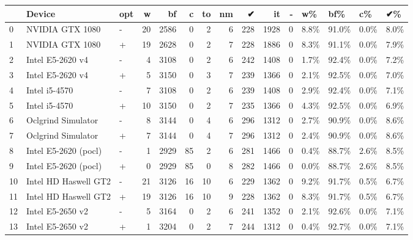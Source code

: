 \begin{tabular}{lllrrrrrrrrllll}
\toprule
{} &                Device & opt &   w &    bf &   c &  to &  nm &    ✔ &    it &  - &    w\% &    bf\% &    c\% &    ✔\% \\
\midrule
0  &       NVIDIA GTX 1080 &   - &  20 &  2586 &   0 &   2 &   6 &  228 &  1928 &  0 &  8.8\% &  91.0\% &  0.0\% &  8.0\% \\
1  &       NVIDIA GTX 1080 &   + &  19 &  2628 &   0 &   2 &   7 &  228 &  1886 &  0 &  8.3\% &  91.1\% &  0.0\% &  7.9\% \\
2  &      Intel E5-2620 v4 &   - &   4 &  3108 &   0 &   2 &   6 &  242 &  1408 &  0 &  1.7\% &  92.4\% &  0.0\% &  7.2\% \\
3  &      Intel E5-2620 v4 &   + &   5 &  3150 &   0 &   3 &   7 &  239 &  1366 &  0 &  2.1\% &  92.5\% &  0.0\% &  7.0\% \\
4  &         Intel i5-4570 &   - &   7 &  3108 &   0 &   2 &   6 &  239 &  1408 &  0 &  2.9\% &  92.4\% &  0.0\% &  7.1\% \\
5  &         Intel i5-4570 &   + &  10 &  3150 &   0 &   2 &   7 &  235 &  1366 &  0 &  4.3\% &  92.5\% &  0.0\% &  6.9\% \\
6  &    Oclgrind Simulator &   - &   8 &  3144 &   0 &   4 &   6 &  296 &  1312 &  0 &  2.7\% &  90.9\% &  0.0\% &  8.6\% \\
7  &    Oclgrind Simulator &   + &   7 &  3144 &   0 &   4 &   7 &  296 &  1312 &  0 &  2.4\% &  90.9\% &  0.0\% &  8.6\% \\
8  &  Intel E5-2620 (pocl) &   - &   1 &  2929 &  85 &   2 &   6 &  281 &  1466 &  0 &  0.4\% &  88.7\% &  2.6\% &  8.5\% \\
9  &  Intel E5-2620 (pocl) &   + &   0 &  2929 &  85 &   0 &   8 &  282 &  1466 &  0 &  0.0\% &  88.7\% &  2.6\% &  8.5\% \\
10 &  Intel HD Haswell GT2 &   - &  21 &  3126 &  16 &  10 &   6 &  229 &  1362 &  0 &  9.2\% &  91.7\% &  0.5\% &  6.7\% \\
11 &  Intel HD Haswell GT2 &   + &  19 &  3126 &  16 &  10 &   9 &  228 &  1362 &  0 &  8.3\% &  91.7\% &  0.5\% &  6.7\% \\
12 &      Intel E5-2650 v2 &   - &   5 &  3164 &   0 &   2 &   6 &  241 &  1352 &  0 &  2.1\% &  92.6\% &  0.0\% &  7.1\% \\
13 &      Intel E5-2650 v2 &   + &   1 &  3204 &   0 &   2 &   7 &  244 &  1312 &  0 &  0.4\% &  92.7\% &  0.0\% &  7.1\% \\
\bottomrule
\end{tabular}
